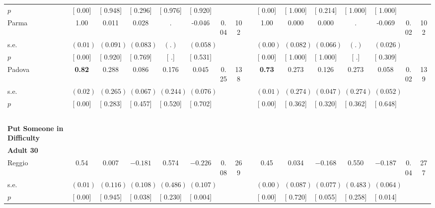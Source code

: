 \begin{longtable}{L{8em} c c c c c c c p{1em} c c c c c c c}
\quad \quad \quad \quad $ p$ & [     0.00] & [    0.948] & [    0.296] & [    0.976] & [    0.920] & & & & [     0.00] & [    1.000] & [    0.214] & [    1.000] & [    1.000] & &  \\[1em]
\quad \quad \quad Parma& 1.00 &     0.011 &     0.028 &         . &    -0.046 &      0.04 &       102 & & 1.00 &     0.000 &     0.000 &         . &    -0.069 &      0.02 &       102  \\*
\quad \quad \quad \quad s.e.& $ (     0.01)$ & $ (    0.091)$ & $ (    0.083)$ & $ (        .)$ & $ (    0.058)$ & & & & $ (     0.00)$ & $ (    0.082)$ & $ (    0.066)$ & $ (        .)$ & $ (    0.026)$ & &  \\*
\quad \quad \quad \quad $ p$ & [     0.00] & [    0.920] & [    0.769] & [        .] & [    0.531] & & & & [     0.00] & [    1.000] & [    1.000] & [        .] & [    0.309] & &  \\[1em]
\quad \quad \quad Padova& \textbf{     0.82} &     0.288 &     0.086 &     0.176 &     0.045 &      0.25 &       138 & & \textbf{     0.73} &     0.273 &     0.126 &     0.273 &     0.058 &      0.02 &       139  \\*
\quad \quad \quad \quad s.e.& $ (     0.02)$ & $ (    0.265)$ & $ (    0.067)$ & $ (    0.244)$ & $ (    0.076)$ & & & & $ (     0.01)$ & $ (    0.274)$ & $ (    0.047)$ & $ (    0.274)$ & $ (    0.052)$ & &  \\*
\quad \quad \quad \quad $ p$ & [     0.00] & [    0.283] & [    0.457] & [    0.520] & [    0.702] & & & & [     0.00] & [    0.362] & [    0.320] & [    0.362] & [    0.648] & &  \\[1em]
~\\[1em]
\textbf{Put Someone in Difficulty} \\*
\quad \quad \textbf{Adult 30} & & & & & & & & & & & & & & & \\* 
\quad \quad \quad Reggio& 0.54 &     0.007 & $ \mathbf{   -0.181}$ &     0.574 & $ \mathbf{   -0.226}$ &      0.08 &       269 & & 0.45 &     0.034 & $ \mathbf{   -0.168}$ &     0.550 & $ \mathbf{   -0.187}$ &      0.04 &       277  \\*
\quad \quad \quad \quad s.e.& $ (     0.01)$ & $ (    0.116)$ & $ (    0.108)$ & $ (    0.486)$ & $ (    0.107)$ & & & & $ (     0.00)$ & $ (    0.087)$ & $ (    0.077)$ & $ (    0.483)$ & $ (    0.064)$ & &  \\*
\quad \quad \quad \quad $ p$ & [     0.00] & [    0.945] & [    0.038] & [    0.230] & [    0.004] & & & & [     0.00] & [    0.720] & [    0.055] & [    0.258] & [    0.014] & &  \\[1em]

\end{longtable}
